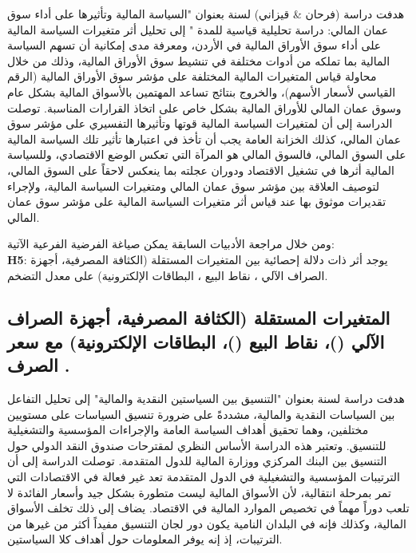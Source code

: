 \documentclass[10pt,a4paper]{report}
\begin{document}
\begin{doublespacing}
هدفت دراسة (فرحان \& قيزاني) لسنة  بعنوان "السياسة المالية وتأثيرها على أداء سوق عمان المالي: دراسة تحليلية قياسية للمدة " إلى تحليل أثر متغيرات السياسة المالية على أداء سوق الأوراق المالية في الأردن، ومعرفة مدى إمكانية أن تسهم السياسة المالية بما تملكه من أدوات مختلفة في تنشيط سوق الأوراق المالية، وذلك من خلال محاولة قياس المتغيرات المالية المختلفة على مؤشر سوق الأوراق المالية (الرقم القياسي لأسعار الأسهم)، والخروج بنتائج تساعد المهتمين بالأسواق المالية بشكل عام وسوق عمان المالي للأوراق المالية بشكل خاص على اتخاذ القرارات المناسبة. توصلت الدراسة إلى أن لمتغيرات السياسة المالية قوتها وتأثيرها التفسيري على مؤشر سوق عمان المالي، كذلك الخزانة العامة يجب أن تأخذ في اعتبارها تأثير تلك السياسة المالية على السوق المالي، فالسوق المالي هو المرآة التي تعكس الوضع الاقتصادي، وللسياسة المالية أثرها في تشغيل الاقتصاد ودوران عجلته بما ينعكس لاحقاً على السوق المالي، لتوصيف العلاقة بين مؤشر سوق عمان المالي ومتغيرات السياسة المالية، ولإجراء تقديرات موثوق بها عند قياس أثر متغيرات السياسة المالية على مؤشر سوق عمان المالي.

ومن خلال مراجعة الأدبيات السابقة يمكن صياغة الفرضية الفرعية الآتية:\\
	\textbf{H5}: يوجد أثر ذات دلالة إحصائية بين المتغيرات المستقلة (الكثافة المصرفية، أجهزة الصراف الآلي ، نقاط البيع ، البطاقات الإلكترونية) على معدل التضخم.
\subsection{المتغيرات المستقلة ({الكثافة المصرفية}، {أجهزة الصراف الآلي} ()، {نقاط البيع} ()، {البطاقات الإلكترونية}) مع سعر الصرف    .
}
هدفت دراسة  لسنة  بعنوان "التنسيق بين السياستين النقدية والمالية" إلى تحليل التفاعل بين السياسات النقدية والمالية، مشددةً على ضرورة تنسيق السياسات على مستويين مختلفين، وهما تحقيق أهداف السياسة العامة والإجراءات المؤسسية والتشغيلية للتنسيق. وتعتبر هذه الدراسة الأساس النظري لمقترحات صندوق النقد الدولي حول التنسيق بين البنك المركزي ووزارة المالية للدول المتقدمة. توصلت الدراسة إلى أن الترتيبات المؤسسية والتشغيلية في الدول المتقدمة تعد غير فعالة في الاقتصادات التي تمر بمرحلة انتقالية، لأن الأسواق المالية ليست متطورة بشكل جيد وأسعار الفائدة لا تلعب دوراً مهماً في تخصيص الموارد المالية في الاقتصاد. يضاف إلى ذلك تخلف الأسواق المالية، وكذلك فإنه في البلدان النامية يكون دور لجان التنسيق مفيداً أكثر من غيرها من الترتيبات، إذ إنه يوفر المعلومات حول أهداف كلا السياستين.


\end{doublespacing}
\end{document}

